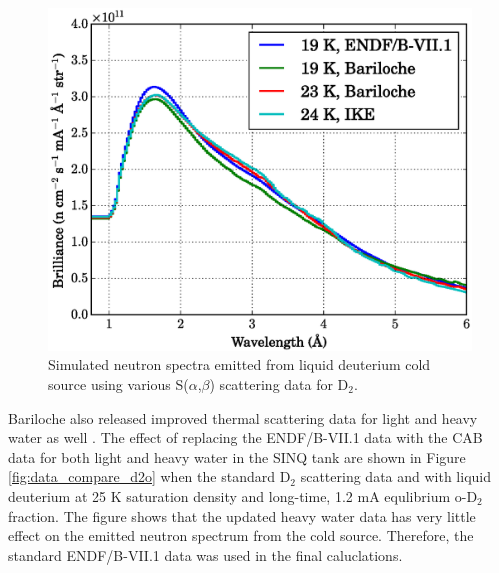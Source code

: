 \documentclass[5p,12pt]{elsarticle}
\begin{document}
\begin{figure}[h!] 
  \centering
    \includegraphics[width=\columnwidth]{graphics/data_compare_d2.eps}
     \caption{Simulated neutron spectra emitted from liquid deuterium cold source using various S($\alpha$,$\beta$) scattering data for D$_2$. \label{fig:data_compare_d2}}
\end{figure}  

Bariloche also released improved thermal scattering data for light and heavy water as well \cite{granada_d2o_1,granada_d2o_2,granada_d2o_3}.  The effect of replacing the ENDF/B-VII.1 data with the CAB data for both light and heavy water in the SINQ tank are shown in Figure \ref{fig:data_compare_d2o} when the standard D$_2$ scattering data and with liquid deuterium at 25 K  saturation density and long-time, 1.2 mA equlibrium o-D$_2$ fraction.  The figure shows that the updated heavy water data has very little effect on the emitted neutron spectrum from the cold source.  Therefore, the standard ENDF/B-VII.1 data was used in the final caluclations.
\end{document}
